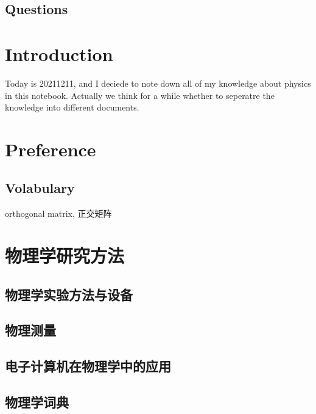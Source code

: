 \section{Questions} %



















\chapter{Introduction}
Today is 20211211, and I deciede to note down all of my knowledge about physics in this notebook. Actually we think for a while whether to seperatre the knowledge into different documents.

\chapter{Preference}



\section{Volabulary}
orthogonal matrix, 正交矩阵



\chapter{物理学研究方法}
    \section{物理学实验方法与设备}
    \section{物理测量}
    \section{电子计算机在物理学中的应用}
    \section{物理学词典}




